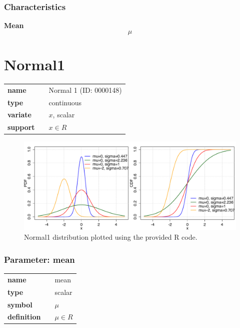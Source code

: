 \subsubsection*{Characteristics}
\smallskip \noindent \hspace{.2cm} \textbf{Mean} 
\begin{equation*}\mu\end{equation*}
\smallskip
\section*{Normal1} 

  \bigskip 

\begin{tabular}{p{2cm}cl}
\textbf{name} & & Normal 1 (ID: 0000148)\\ 
 
\textbf{type} & & continuous \\ 

\textbf{variate} & & $x$, scalar \\ 

\textbf{support} & & $x \in R$
\end{tabular}

\begin{figure}[ht!]
\centering
  \includegraphics[width=140mm]{pics/Normal1.pdf}
 \caption{Normal1 distribution plotted using the provided R code.}
 \label{fig:Normal1}
\end{figure}

\subsubsection*{Parameter: mean}

\noindent\begin{tabular}{p{2cm}cl}
\textbf{name} & & mean \\
\textbf{type} & & scalar \\
\textbf{symbol} & & $\mu$  \\
\textbf{definition} & & $\mu \in R$
\end{tabular}
